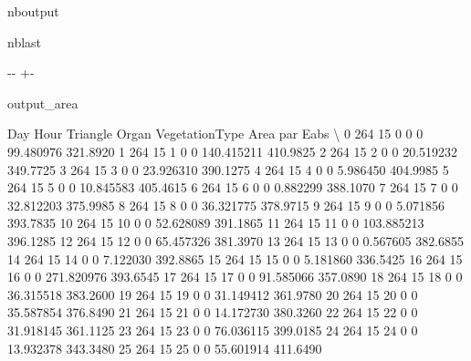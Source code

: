 \documentclass[letterpaper,10pt,english]{sphinxmanual}
\begin{document}
\begin{sphinxuseclass}{nboutput}
\begin{sphinxuseclass}{nblast}
{

\kern-\sphinxverbatimsmallskipamount\kern-\baselineskip
\kern+\FrameHeightAdjust\kern-\fboxrule
\vspace{\nbsphinxcodecellspacing}

\begin{sphinxuseclass}{output_area}
\begin{sphinxuseclass}{}


\begin{sphinxVerbatim}[commandchars=\\\{\}]
    Day  Hour  Triangle  Organ  VegetationType        Area  par Eabs  \textbackslash{}
0   264    15         0      0               0   99.480976  321.8920
1   264    15         1      0               0  140.415211  410.9825
2   264    15         2      0               0   20.519232  349.7725
3   264    15         3      0               0   23.926310  390.1275
4   264    15         4      0               0    5.986450  404.9985
5   264    15         5      0               0   10.845583  405.4615
6   264    15         6      0               0    0.882299  388.1070
7   264    15         7      0               0   32.812203  375.9985
8   264    15         8      0               0   36.321775  378.9715
9   264    15         9      0               0    5.071856  393.7835
10  264    15        10      0               0   52.628089  391.1865
11  264    15        11      0               0  103.885213  396.1285
12  264    15        12      0               0   65.457326  381.3970
13  264    15        13      0               0    0.567605  382.6855
14  264    15        14      0               0    7.122030  392.8865
15  264    15        15      0               0    5.181860  336.5425
16  264    15        16      0               0  271.820976  393.6545
17  264    15        17      0               0   91.585066  357.0890
18  264    15        18      0               0   36.315518  383.2600
19  264    15        19      0               0   31.149412  361.9780
20  264    15        20      0               0   35.587854  376.8490
21  264    15        21      0               0   14.172730  380.3260
22  264    15        22      0               0   31.918145  361.1125
23  264    15        23      0               0   76.036115  399.0185
24  264    15        24      0               0   13.932378  343.3480
25  264    15        25      0               0   55.601914  411.6490

\end{sphinxVerbatim}
\end{sphinxuseclass}
\end{sphinxuseclass}}
\end{sphinxuseclass}
\end{sphinxuseclass}
\end{document}
